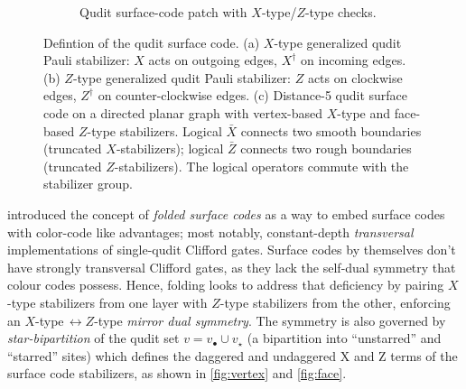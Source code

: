 \begin{figure}[H]
\begin{minipage}[t]{0.60\textwidth}
\begin{subfigure}[t]{\linewidth}
      \caption{Qudit surface-code patch with $X$-type/$Z$-type checks.}
      \label{fig:patch}
    \end{subfigure}
  \end{minipage}

  \caption{Defintion of the qudit surface code.
  (a) $X$-type generalized qudit Pauli stabilizer: $X$ acts on outgoing edges, $X^\dagger$ on incoming edges. 
  (b) $Z$-type generalized qudit Pauli stabilizer: $Z$ acts on clockwise edges, $Z^\dagger$ on counter-clockwise edges. 
  (c) Distance-5 qudit surface code on a directed planar graph with vertex-based $X$-type and face-based $Z$-type stabilizers. Logical $\bar{X}$ connects two smooth boundaries (truncated $X$-stabilizers); logical $\bar{Z}$ connects two rough boundaries (truncated $Z$-stabilizers). The logical operators commute with the stabilizer group.}
  \label{fig:qudit-surface-code}
\end{figure}

\cite{Moussa2016} introduced the concept of \emph{folded surface codes} as a way to embed surface codes with color-code like advantages; most notably, constant-depth \emph{transversal} implementations of single-qudit Clifford gates. Surface codes by themselves don't have strongly transversal Clifford gates, as they lack the self-dual symmetry that colour codes possess. Hence, folding looks to address that deficiency by pairing $X$-type stabilizers from one layer with $Z$-type stabilizers from the other, enforcing an
$X$-type$ \,\leftrightarrow\! Z$-type \emph{mirror dual symmetry}. The symmetry is also governed by \emph{star-bipartition} of the qudit set $v=v_\bullet\cup v_\star$ (a bipartition into “unstarred” and
“starred” sites) which defines the daggered and undaggered X and Z terms of the surface code stabilizers, as shown in \autoref{fig:vertex} and \autoref{fig:face}. 

